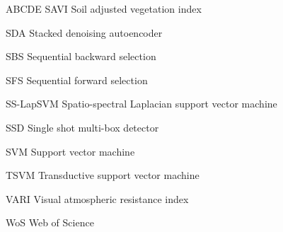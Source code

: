 \begin{seznamzkratek}{ABCDE}
	      {SAVI}
	      {Soil adjusted vegetation index}

	      {SDA}
	      {Stacked denoising autoencoder}

	      {SBS}
	      {Sequential backward selection}

	      {SFS}
	      {Sequential forward selection}

	      {SS-LapSVM}
	      {Spatio-spectral Laplacian support vector machine}

	      {SSD}
	      {Single shot multi-box detector}

	      {SVM}
	      {Support vector machine}

	      {TSVM}
	      {Transductive support vector machine}

	      {VARI}
	      {Visual atmospheric resistance index}

	      {WoS}
	      {Web of Science}
	      
\end{seznamzkratek}